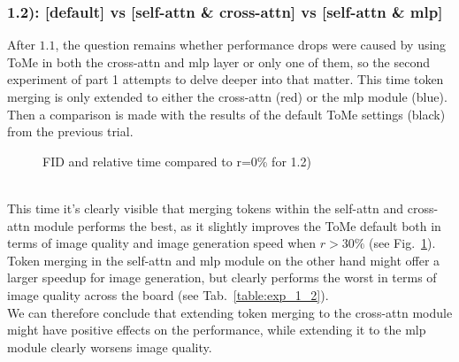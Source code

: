 \subsubsection*{1.2): [default] vs [self-attn \& cross-attn] vs [self-attn \& mlp]}
After \(1.1\), the question remains whether performance drops were caused by using ToMe in both the cross-attn and mlp layer or only one of them, so the second experiment of part 1 attempts to delve deeper into that matter. This time token merging is only extended to either the cross-attn (red) or the mlp module (blue). Then a comparison is made with the results of the default ToMe settings (black) from the previous trial.
\begin{figure}[!htb]
    
    
\caption{FID and relative time compared to r=0\% for 1.2)}
\label{fig:exp_1_2}
\end{figure}\\
This time it's clearly visible that merging tokens within the self-attn and cross-attn module performs the best, as it slightly improves the ToMe default both in terms of image quality and image generation speed when \(r > 30\%\) (see Fig.~\ref{fig:exp_1_2}).\\
Token merging in the self-attn and mlp module on the other hand might offer a larger speedup for image generation, but clearly performs the worst in terms of image quality across the board (see Tab.~\ref{table:exp_1_2}).\\
We can therefore conclude that extending token merging to the cross-attn module might have positive effects on the performance, while extending it to the mlp module clearly worsens image quality.



